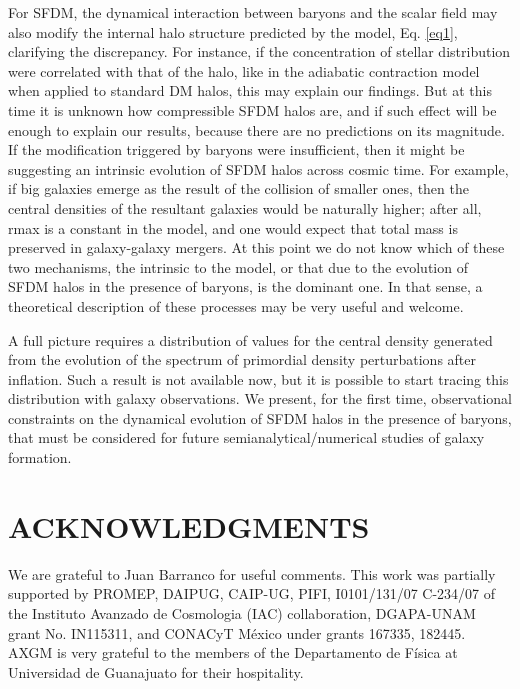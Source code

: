 \documentclass[10pt,a4paper]{article}
\begin{document}
\begin{multicols}{2}
For SFDM, the dynamical interaction between baryons and the scalar field may also modify the internal halo structure predicted by the model, Eq. \eqref{eq1}, clarifying the discrepancy. For instance, if the concentration of stellar distribution were correlated with that of the halo, like in the adiabatic contraction model when applied to standard DM halos, this may explain our findings. But at this time it is unknown how compressible SFDM halos are, and if such effect will be enough to explain our results, because there are no predictions on its magnitude. If the modification triggered by baryons were insufficient, then it might be suggesting an intrinsic evolution of SFDM halos across cosmic time. For example, if big galaxies emerge as the result of the collision of smaller ones, then the central densities of the resultant galaxies would be naturally higher; after all, rmax is a constant in the model, and one would expect that total mass is preserved in galaxy-galaxy mergers. At this point we do not know which of these two mechanisms, the intrinsic to the model, or that due to the evolution of SFDM halos in the presence of baryons, is the dominant one. In that sense, a theoretical description of these processes may be very useful and welcome.\

A full picture requires a distribution of values for the central density generated from the evolution of the spectrum of primordial density perturbations after inflation. Such a result is not available now, but it is possible to start tracing this distribution with galaxy observations. We present, for the first time, observational constraints on the dynamical evolution of SFDM halos in the presence of baryons, that must be considered for future semianalytical/numerical studies of galaxy formation.

\section*{ACKNOWLEDGMENTS}
We are grateful to Juan Barranco for useful comments. This work was partially supported by PROMEP, DAIPUG, CAIP-UG, PIFI, I0101/131/07 C-234/07 of the Instituto Avanzado de Cosmologia (IAC) collaboration, DGAPA-UNAM grant No. IN115311, and CONACyT México under grants 167335, 182445. AXGM is very grateful to the members of the Departamento de Física at Universidad de Guanajuato for their hospitality.




\end{multicols}
\end{document}
